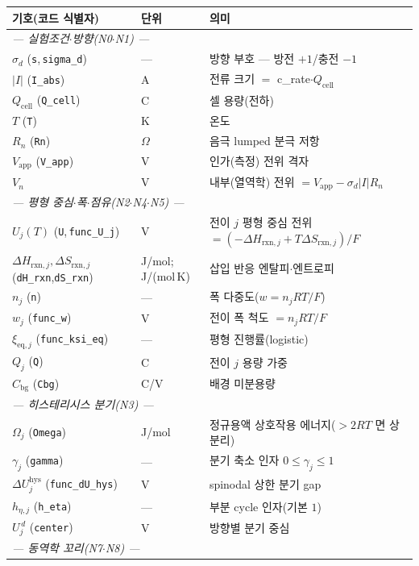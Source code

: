 \documentclass[11pt,a4paper]{article}
\newcommand{\eq}{\mathrm{eq}}
\newcommand{\app}{\mathrm{app}}
\newcommand{\cell}{\mathrm{cell}}
\newcommand{\bg}{\mathrm{bg}}
\newcommand{\rxn}{\mathrm{rxn}}
\newcommand{\hys}{\mathrm{hys}}
\newcommand{\code}[1]{\texttt{#1}}
\begin{document}
\begin{longtable}{p{} p{} p{}}
\toprule 기호(코드 식별자) & 단위 & 의미 \\ \midrule \endhead
\multicolumn{3}{l}{\emph{— 실험조건$\cdot$방향(N0$\cdot$N1) —}}\\
$\sigma_d$ (\code{s},\,\code{sigma\_d}) & --- & 방향 부호 — 방전 $+1$/충전 $-1$ \\
$|I|$ (\code{I\_abs}) & A & 전류 크기 $=$ c\_rate$\cdot Q_\cell$ \\
$Q_\cell$ (\code{Q\_cell}) & C & 셀 용량(전하) \\
$T$ (\code{T}) & K & 온도 \\
$R_n$ (\code{Rn}) & $\Omega$ & 음극 lumped 분극 저항 \\
$V_\app$ (\code{V\_app}) & V & 인가(측정) 전위 격자 \\
$V_n$ & V & 내부(열역학) 전위 $=V_\app-\sigma_d|I|R_n$ \\
\multicolumn{3}{l}{\emph{— 평형 중심$\cdot$폭$\cdot$점유(N2$\cdot$N4$\cdot$N5) —}}\\
$U_j(T)$ (\code{U},\,\code{func\_U\_j}) & V & 전이 $j$ 평형 중심 전위 $=(-\Delta H_{\rxn,j}+T\Delta S_{\rxn,j})/F$ \\
$\Delta H_{\rxn,j},\Delta S_{\rxn,j}$ (\code{dH\_rxn},\code{dS\_rxn}) & {\footnotesize J/mol;\,J/(mol\,K)} & 삽입 반응 엔탈피$\cdot$엔트로피 \\
$n_j$ (\code{n}) & --- & 폭 다중도($w=n_jRT/F$) \\
$w_j$ (\code{func\_w}) & V & 전이 폭 척도 $=n_jRT/F$ \\
$\xi_{\eq,j}$ (\code{func\_ksi\_eq}) & --- & 평형 진행률(logistic) \\
$Q_j$ (\code{Q}) & C & 전이 $j$ 용량 가중 \\
$C_\bg$ (\code{Cbg}) & C/V & 배경 미분용량 \\
\multicolumn{3}{l}{\emph{— 히스테리시스 분기(N3) —}}\\
$\Omega_j$ (\code{Omega}) & J/mol & 정규용액 상호작용 에너지($>2RT$ 면 상분리) \\
$\gamma_j$ (\code{gamma}) & --- & 분기 축소 인자 $0\le\gamma_j\le1$ \\
$\Delta U_j^\hys$ (\code{func\_dU\_hys}) & V & spinodal 상한 분기 gap \\
$h_{\eta,j}$ (\code{h\_eta}) & --- & 부분 cycle 인자(기본 $1$) \\
$U_j^{\,d}$ (\code{center}) & V & 방향별 분기 중심 \\
\multicolumn{3}{l}{\emph{— 동역학 꼬리(N7$\cdot$N8) —}}\\

\end{longtable}
\end{document}
